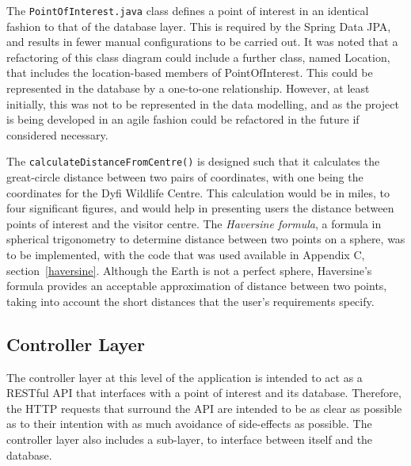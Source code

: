 The \texttt{PointOfInterest.java} class defines a point of interest in an identical fashion to that of the database layer. This is required by the Spring Data JPA, and results in fewer manual configurations to be carried out. It was noted that a refactoring of this class diagram could include a further class, named Location, that includes the location-based members of PointOfInterest. This could be represented in the database by a one-to-one relationship. However, at least initially, this was not to be represented in the data modelling, and as the project is being developed in an agile fashion could be refactored in the future if considered necessary.

The \texttt{calculateDistanceFromCentre()} is designed such that it calculates the great-circle distance between two pairs of coordinates, with one being the coordinates for the Dyfi Wildlife Centre. This calculation would be in miles, to four significant figures, and would help in presenting users the distance between points of interest and the visitor centre. The \textit{Haversine formula}, a formula in spherical trigonometry to determine distance between two points on a sphere, was to be implemented, with the code that was used available in Appendix C, section~\ref{haversine}. Although the Earth is not a perfect sphere, Haversine's formula provides an acceptable approximation of distance between two points, taking into account the short distances that the user's requirements specify.

\subsection{Controller Layer}

The controller layer at this level of the application is intended to act as a RESTful API that interfaces with a point of interest and its database. Therefore, the HTTP requests that surround the API are intended to be as clear as possible as to their intention with as much avoidance of side-effects as possible. The controller layer also includes a sub-layer, to interface between itself and the database.

